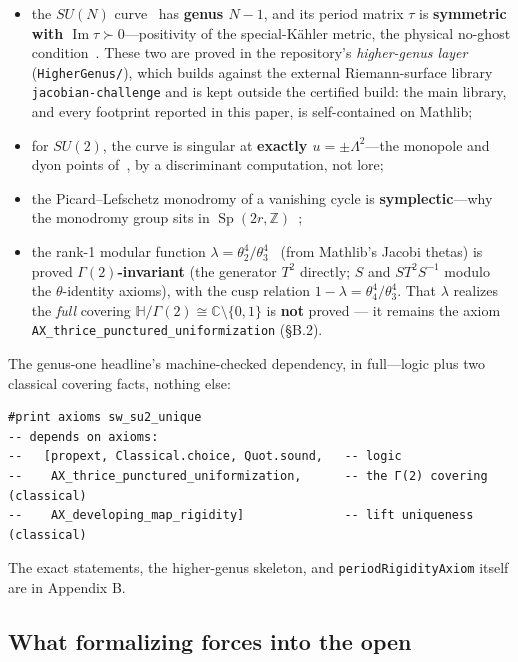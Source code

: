 \documentclass{article}
\theoremstyle{plain}
\theoremstyle{definition}
\numberwithin{equation}{section}
\newcommand{\Z}{\mathbb{Z}}
\newcommand{\Sp}{\operatorname{Sp}}
\newcommand{\Imag}{\operatorname{Im}}
\newcommand{\code}[1]{\texttt{#1}}
\begin{document}
\begin{itemize}
\item the $SU(N)$ curve~\cite{KLYT1995,ArgyresFaraggi1995} has \textbf{genus $N-1$}, and its
period matrix $\tau$ is \textbf{symmetric with $\Imag\tau \succ 0$}---positivity of the
special-K\"ahler metric, the physical no-ghost condition~\cite{SeibergWitten1994a,Lerche1997}.
These two are proved in the repository's \emph{higher-genus layer} (\code{HigherGenus/}),
which builds against the external Riemann-surface library \code{jacobian-challenge} and is
kept outside the certified build: the main library, and every footprint reported in this
paper, is self-contained on Mathlib;
\item for $SU(2)$, the curve is singular at \textbf{exactly $u = \pm\Lambda^2$}---the monopole and
dyon points of~\cite{SeibergWitten1994a}, by a discriminant computation, not lore;
\item the Picard--Lefschetz monodromy of a vanishing cycle is \textbf{symplectic}---why the
monodromy group sits in $\Sp(2r,\Z)$~\cite{Lerche1997};
\item the rank-1 modular function $\lambda = \theta_2^4/\theta_3^4$~\cite{Bilal1996} (from Mathlib's Jacobi thetas)
is proved \textbf{$\Gamma(2)$-invariant} (the generator $T^2$ directly; $S$ and $ST^2S^{-1}$ modulo the
$\theta$-identity axioms), with the cusp relation $1-\lambda = \theta_4^4/\theta_3^4$. That $\lambda$
realizes the \emph{full} covering $\mathbb{H}/\Gamma(2)\cong\mathbb{C}\setminus\{0,1\}$ is \textbf{not}
proved --- it remains the axiom \code{AX\_thrice\_punctured\_uniformization} (\S B.2).
\end{itemize}

The genus-one headline's machine-checked dependency, in full---logic plus two classical
covering facts, nothing else:

\begin{Verbatim}
#print axioms sw_su2_unique
-- depends on axioms:
--   [propext, Classical.choice, Quot.sound,   -- logic
--    AX_thrice_punctured_uniformization,      -- the Γ(2) covering  (classical)
--    AX_developing_map_rigidity]              -- lift uniqueness    (classical)
\end{Verbatim}

\noindent The exact statements, the higher-genus skeleton, and \code{periodRigidityAxiom} itself are in
Appendix B.

\subsection{What formalizing forces into the open}
\end{document}
